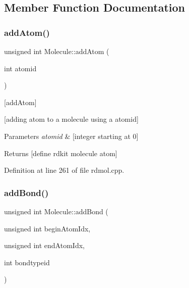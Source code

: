 \subsection{Member Function Documentation}
\mbox{\label{class_molecule_a2ef7b76adda28cd4932d07c35d330f71}} 
\subsubsection{\texorpdfstring{add\+Atom()}{addAtom()}}
{\footnotesize\ttfamily unsigned int Molecule\+::add\+Atom (\begin{DoxyParamCaption}\item[{int}]{atomid }\end{DoxyParamCaption})}



\mbox{[}add\+Atom\mbox{]} 

\mbox{[}adding atom to a molecule using a atomid\mbox{]}


\begin{DoxyParams}{Parameters}
{\em atomid} & \mbox{[}integer starting at 0\mbox{]} \\
\hline
\end{DoxyParams}
\begin{DoxyReturn}{Returns}
\mbox{[}define rdkit molecule atom\mbox{]} 
\end{DoxyReturn}


Definition at line 261 of file rdmol.\+cpp.

\mbox{\label{class_molecule_ad1c8dfe8ea7c2026bcdbdd2c90fa17b8}} 
\subsubsection{\texorpdfstring{add\+Bond()}{addBond()}}
{\footnotesize\ttfamily unsigned int Molecule\+::add\+Bond (\begin{DoxyParamCaption}\item[{unsigned int}]{begin\+Atom\+Idx,  }\item[{unsigned int}]{end\+Atom\+Idx,  }\item[{int}]{bondtypeid }\end{DoxyParamCaption})}



